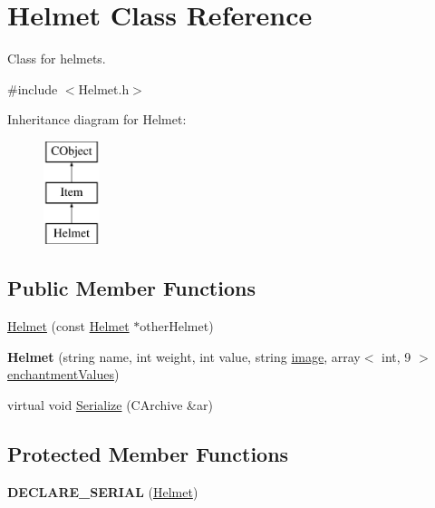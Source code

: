 \hypertarget{class_helmet}{}\section{Helmet Class Reference}
\label{class_helmet}


Class for helmets.  




{\ttfamily \#include $<$Helmet.\+h$>$}

Inheritance diagram for Helmet\+:\begin{figure}[H]
\begin{center}
\leavevmode
\includegraphics[height=3.000000cm]{class_helmet}
\end{center}
\end{figure}
\subsection*{Public Member Functions}
\begin{DoxyCompactItemize}
\item 
\hyperlink{class_helmet_a27eceb089c04d2dcab69d49d30d7b92c}{Helmet} (const \hyperlink{class_helmet}{Helmet} $\ast$other\+Helmet)
\item 
\hypertarget{class_helmet_a53c7728aebd2aadb37082834cbec4968}{}\label{class_helmet_a53c7728aebd2aadb37082834cbec4968} 
{\bfseries Helmet} (string name, int weight, int value, string \hyperlink{class_item_add84a42b692ee5d580a92ae4a922f784}{image}, array$<$ int, 9 $>$ \hyperlink{class_item_a8532d8729f9433f41b7fc18b20d83236}{enchantment\+Values})
\item 
virtual void \hyperlink{class_helmet_abb01d02590723236e9cf9e260824e712}{Serialize} (C\+Archive \&ar)
\end{DoxyCompactItemize}
\subsection*{Protected Member Functions}
\begin{DoxyCompactItemize}
\item 
\hypertarget{class_helmet_a4d6756de7cf75e7cf04548c74d045ae2}{}\label{class_helmet_a4d6756de7cf75e7cf04548c74d045ae2} 
{\bfseries D\+E\+C\+L\+A\+R\+E\+\_\+\+S\+E\+R\+I\+AL} (\hyperlink{class_helmet}{Helmet})
\end{DoxyCompactItemize}
